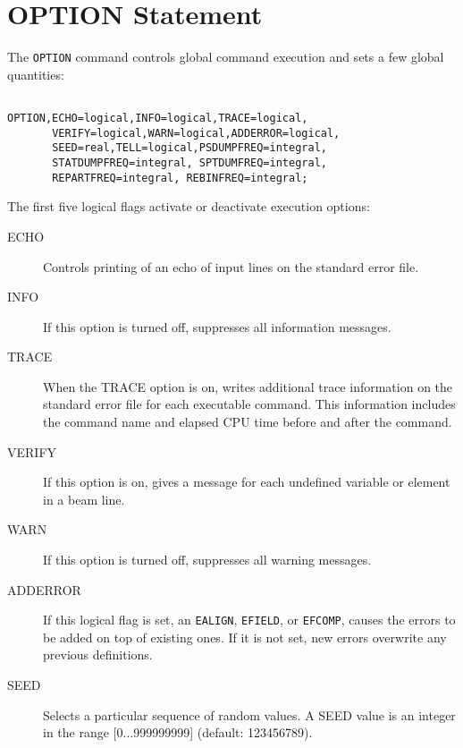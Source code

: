 \section{OPTION Statement}
\label{sec:option}
The \texttt{OPTION} command controls global command execution and sets
a few global quantities:
\begin{verbatim}

OPTION,ECHO=logical,INFO=logical,TRACE=logical,
       VERIFY=logical,WARN=logical,ADDERROR=logical,
       SEED=real,TELL=logical,PSDUMPFREQ=integral, 
       STATDUMPFREQ=integral, SPTDUMFREQ=integral,
       REPARTFREQ=integral, REBINFREQ=integral;
\end{verbatim}
The first five logical flags activate or deactivate execution options:
\begin{description}
\item[ECHO]
  Controls printing of an echo of input lines on the standard error file.
\item[INFO]
  If this option is turned off, \opal suppresses all information messages. 
\item[TRACE]
  When the TRACE option is on,
  \opal writes additional trace information on the standard error file 
  for each executable command. 
  This information includes the command name
  and elapsed CPU time before and after the command.
\item[VERIFY]
  If this option is on, \opal gives a message for each undefined variable
  or element in a beam line.
\item[WARN]
  If this option is turned off, \opal suppresses all warning messages.
\item[ADDERROR]
  If this logical flag is set,
  an \texttt{EALIGN}, \texttt{EFIELD}, or \texttt{EFCOMP}, causes the errors to
  be added on top of existing ones.
  If it is not set, new errors overwrite any previous definitions.
\item[SEED]
  Selects a particular sequence of random values.
  A SEED value is an integer in the range [0...999999999] (default: 123456789).

\end{description}

